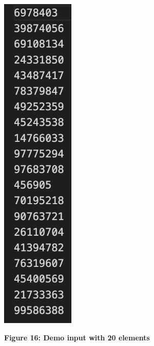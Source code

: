 ~\\
\centerline {\includegraphics[scale = 1, width=3.5cm]{para_in}}
\centerline{\textbf {Figure 16: Demo input with 20 elements}}
~\\
